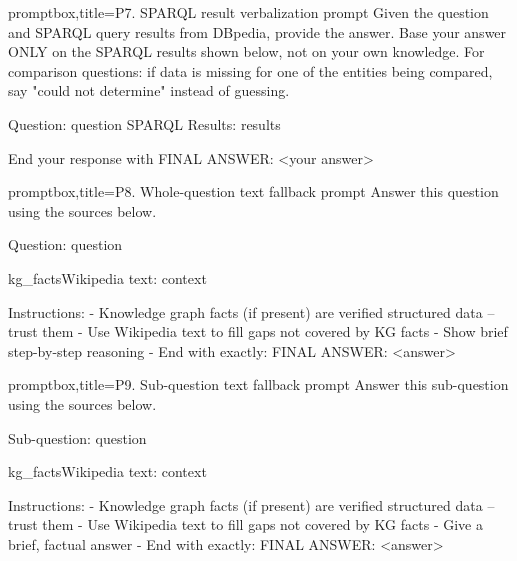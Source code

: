 \documentclass[11pt]{article}
\begin{document}
\begin{tcblisting}{promptbox,title={P7. SPARQL result verbalization prompt}}
Given the question and SPARQL query results from DBpedia, provide the answer.
Base your answer ONLY on the SPARQL results shown below, not on your own knowledge.
For comparison questions: if data is missing for one of the entities being compared, say "could not determine" instead of guessing.

Question: {question}
SPARQL Results:
{results}

End your response with FINAL ANSWER: <your answer>
\end{tcblisting}

\begin{tcblisting}{promptbox,title={P8. Whole-question text fallback prompt}}
Answer this question using the sources below.

Question: {question}

{kg_facts}Wikipedia text:
{context}

Instructions:
- Knowledge graph facts (if present) are verified structured data -- trust them
- Use Wikipedia text to fill gaps not covered by KG facts
- Show brief step-by-step reasoning
- End with exactly: FINAL ANSWER: <answer>
\end{tcblisting}

\begin{tcblisting}{promptbox,title={P9. Sub-question text fallback prompt}}
Answer this sub-question using the sources below.

Sub-question: {question}

{kg_facts}Wikipedia text:
{context}

Instructions:
- Knowledge graph facts (if present) are verified structured data -- trust them
- Use Wikipedia text to fill gaps not covered by KG facts
- Give a brief, factual answer
- End with exactly: FINAL ANSWER: <answer>
\end{tcblisting}
\end{document}

